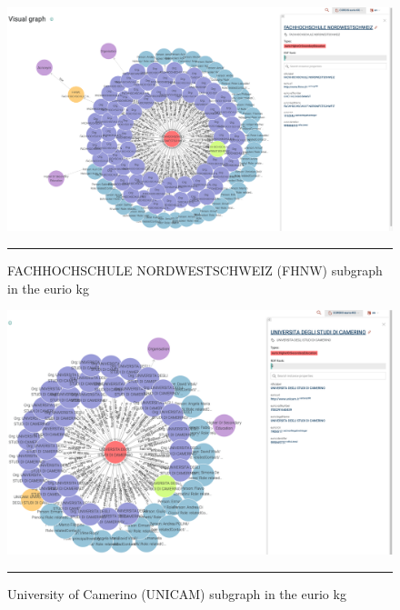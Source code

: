 \begin{figure}[htbp]
    \centering
 \includegraphics[width=\textwidth]{figures/data-analysis/graphdb-fhnw.png}
     \rule{35em}{0.5pt}
    \caption{FACHHOCHSCHULE NORDWESTSCHWEIZ (FHNW) subgraph in the \gls{eurio} \gls{kg}}
 \label{fig:fhnw-graphdb}
\end{figure}

\begin{figure}[htbp]
    \centering
 \includegraphics[width=\textwidth]{figures/data-analysis/graphdb-unicam.png}
     \rule{35em}{0.5pt}
    \caption{University of Camerino (UNICAM) subgraph in the \gls{eurio} \gls{kg}}
 \label{fig:unicam-graphdb}
\end{figure}